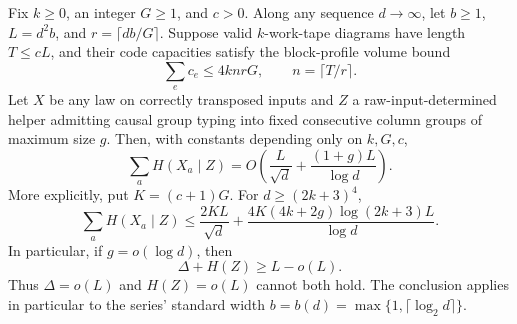 \begin{corollary}
\label{cor:causal-group-obstruction}
Fix $k\ge0$, an integer $G\ge1$, and $c>0$.  Along any sequence
$d\to\infty$, let $b\ge1$, $L=d^2b$, and
$r=\lceil db/G\rceil$.  Suppose valid $k$-work-tape diagrams have
length $T\le cL$, and their code capacities satisfy the block-profile
volume bound
\[
 \sum_e c_e\le4knrG,
 \qquad n=\lceil T/r\rceil.
\]
Let $X$ be any law on correctly transposed inputs and $Z$ a
raw-input-determined helper admitting causal group typing into fixed
consecutive column groups of maximum size $g$.  Then, with constants
depending only on $k,G,c$,
\begin{equation}\label{eq:causal-group-asymptotic}
 \sum_aH(X_a\mid Z)
 =O\!\left(\frac{L}{\sqrt d}+\frac{(1+g)L}{\log d}\right).
\end{equation}
More explicitly, put $K=(c+1)G$. For $d\ge(2k+3)^4$,
\begin{equation}\label{eq:causal-group-explicit}
 \sum_aH(X_a\mid Z)\le
 \frac{2KL}{\sqrt d}
 +\frac{4K(4k+2g)\log(2k+3)L}{\log d}.
\end{equation}
In particular, if $g=o(\log d)$, then
\[
 \Delta+H(Z)\ge L-o(L).
\]
Thus $\Delta=o(L)$ and $H(Z)=o(L)$ cannot both hold.  The conclusion
applies in particular to the series' standard width
$b=b(d)=\max\{1,\lceil\log_2d\rceil\}$.
\end{corollary}

